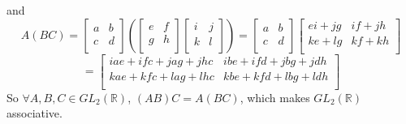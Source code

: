 \documentclass[12pt]{article}
\newcommand{\R}{\mathbb{R}}
\begin{document}
    and 
    \[ A(BC) =
    \begin{bmatrix}
    a & b \\
    c & d \\
    \end{bmatrix}
    \left( \begin{bmatrix}
    e & f \\
    g & h \\
    \end{bmatrix}
    \begin{bmatrix}
    i & j \\
    k & l \\
    \end{bmatrix} \right)
    = \begin{bmatrix}
    a & b \\
    c & d \\
    \end{bmatrix}
    \begin{bmatrix}
    ei + jg & if + jh \\
    ke + lg & kf + kh \\
    \end{bmatrix} \]
    \[ = \begin{bmatrix}
    iae + ifc + jag + jhc & ibe + ifd + jbg + jdh \\
    kae + kfc + lag + lhc & kbe + kfd + lbg + ldh \\
    \end{bmatrix} \]
    So $\forall A, B, C \in GL_2(\R)$, $(AB)C = A(BC)$,
    which makes $GL_2(\R)$ associative.
\end{document}
